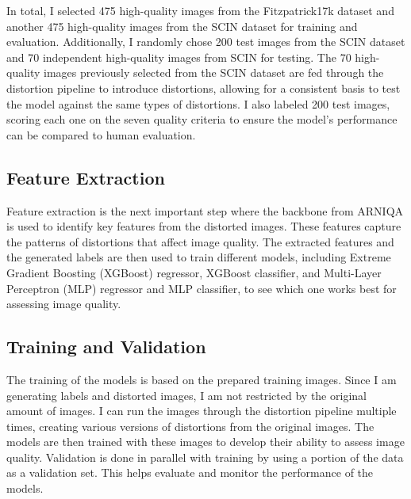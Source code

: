 \vspace{\baselineskip}
\noindent
In total, I selected 475 high-quality images from the Fitzpatrick17k dataset and another 475 high-quality images from the SCIN dataset for training and evaluation. Additionally, I randomly chose 200 test images from the SCIN dataset and 70 independent high-quality images from SCIN for testing. The 70 high-quality images previously selected from the SCIN dataset are fed through the distortion pipeline to introduce distortions, allowing for a consistent basis to test the model against the same types of distortions. I also labeled 200 test images, scoring each one on the seven quality criteria to ensure the model’s performance can be compared to human evaluation. \par

\subsection{Feature Extraction}
\label{sub:FeatureExtraction}
Feature extraction is the next important step where the backbone from ARNIQA is used to identify key features from the distorted images. These features capture the patterns of distortions that affect image quality. The extracted features and the generated labels are then used to train different models, including Extreme Gradient Boosting (XGBoost) regressor, XGBoost classifier, and Multi-Layer Perceptron (MLP) regressor and MLP classifier, to see which one works best for assessing image quality. \par

\subsection{Training and Validation}
\label{sub:TrainVal}
The training of the models is based on the prepared training images. Since I am generating labels and distorted images, I am not restricted by the original amount of images. I can run the images through the distortion pipeline multiple times, creating various versions of distortions from the original images. The models are then trained with these images to develop their ability to assess image quality. Validation is done in parallel with training by using a portion of the data as a validation set. This helps evaluate and monitor the performance of the models. \par 


